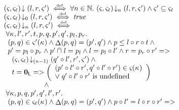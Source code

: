 \begin{definition}
\[
\hspace*{-0.2cm}
\begin{array}{l}
	\extendsAM{\amod{}, \amod{\ell}}{l}{r}{\amod{}'} \iffdef \for{n \in \Nats} \extendsAMUpto{\amod{}, \amod{\ell}}{n}{l}{r}{\amod{}'}  \land \amod{}' \subseteq \amod{\ell}\\
	
	
	\extendsAMUpto{\amod{}, \amod{\ell}}{0}{l}{r}{\amod{}'} \iffdef \m{true} \\ 



	\extendsAMUpto{\amod{}, \amod{\ell}}{n}{l}{r}{\amod{}'} \iffdef \\ 

	\hspace*{0.1cm}\for{\ca{}, l', r', t, p, q, p', q', p_l, p_r}\\
	
	\hspace*{0.2cm}(p, q) \in \amod{}'(\ca{}) 
	\land \updateFP{p, q} = (p', q')
	\land p \leq  l \composeL r \composeL t \land\null\\
	
	\hspace*{0.2cm}p' = p_l \composeL p_r 
	\land p' \maxMeetL l = p_l 
	\land l = p_l \composeL l' 
	\land r = p_r \composeL r' =>\\
	
	\hspace*{0.4cm} \extendsAMUpto{\amod{}, \amod{\ell}}{(n-1)}{q' \composeL l'}{r'}{\amod{}'} \land\null\\
	\hspace*{0.4cm}t = \unitL => 
	\left(
	\begin{array}{l}
		(p' \composeL l' \composeL r', q' \composeL l' \composeL r') \in \amod{}(\ca{})\\
		\lor\; q' \composeL l' \composeL r' \text{ is undefined} 
	\end{array}
	\right)\\
	
		\hspace*{2cm} \land\\
	

  \hspace*{0.1cm}\for{\ca{}, p, q, p', q', l', r'} \\
  
  \hspace*{0.2cm} (p, q) \in \amod{\ell}(\ca{})
  \land \updateFP{p, q} = (p', q')
  \land p \composeL l' = l \composeL r \composeL r' =>\\
  

\end{array}\]
\end{definition}
